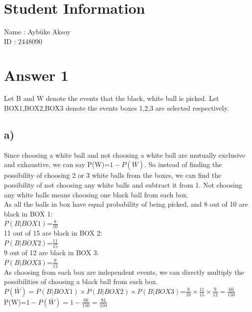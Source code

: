 \documentclass[12pt]{article}
\begin{document}
\section*{Student Information}

Name : Aybüke Aksoy\\

ID : 2448090\\


\section*{Answer 1}
Let B and W denote the events that the black, white ball is picked. Let BOX1,BOX2,BOX3 denote the events boxes 1,2,3 are selected respectively.
\subsection*{a)}
Since choosing a white ball and not choosing a white ball are mutually exclusive and exhaustive, we can say P(W)=$1-P(\overline{W})$. 
So instead of finding the possibility of choosing 2 or 3 white balls from the boxes, we can find the possibility of not choosing any white balls and subtract it from 1. Not choosing any white balls means choosing one black ball from each box.\\
As all the balls in box have equal probability of being picked, and 8 out of 10 are black in BOX 1:\\
$P(B|BOX1)$=$\frac{8}{10}$\\
11 out of 15 are black in BOX 2:\\
$P(B|BOX2)$=$\frac{11}{15}$\\
9 out of 12 are black in BOX 3:\\
$P(B|BOX3)$=$\frac{9}{12}$\\
As choosing from each box are independent events, we can directly multiply the possibilities of choosing a black ball from each box.\\
$P(\overline{W})=P(B|BOX1)\times P(B|BOX2) \times P(B|BOX3)$=$\frac{8}{10} \times \frac{11}{15} \times \frac{9}{12}=\frac{66}{150}$\\
P(W)=$1-P(\overline{W})=1-\frac{66}{150}=\frac{84}{150}$\\
\end{document}

